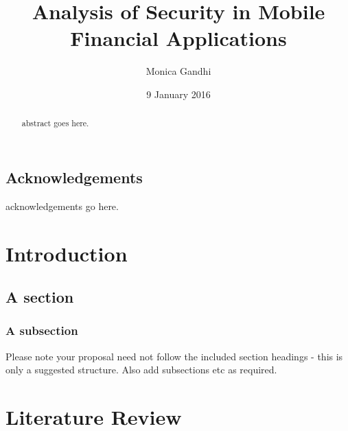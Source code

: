 \documentclass{mproj}
\begin{document}
\title{Analysis of Security in Mobile Financial Applications}
\author{Monica Gandhi}
\date{9 January 2016}
\maketitle

\begin{abstract}
abstract goes here.
\end{abstract}

\educationalconsent


\newpage
\section*{Acknowledgements}

acknowledgements go here.

\tableofcontents

\chapter{Introduction}\label{intro}

\section{A section}
\subsection{A subsection}
Please note your proposal need not follow the included section headings - this is only a suggested structure. Also add subsections etc as required.

\chapter{Literature Review}\label{survey}
\end{document}
